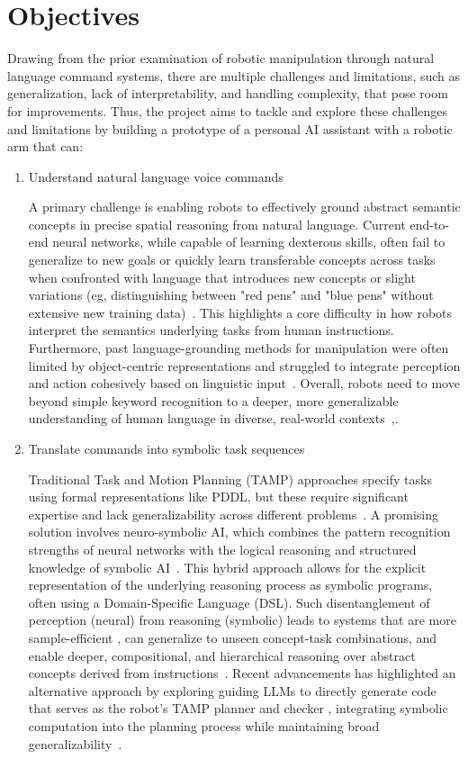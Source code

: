 \documentclass[12pt]{extarticle}
\begin{document}
\section{Objectives}
\label{sec: objectives}
Drawing from the prior examination of robotic manipulation through natural language command systems, there are multiple challenges and limitations, such as generalization, lack of interpretability, and handling complexity, that pose room for improvements. Thus, the project aims to tackle and explore these challenges and limitations by building a prototype of a personal AI assistant with a robotic arm that can:
\begin{enumerate}
  \item Understand natural language voice commands

  A primary challenge is enabling robots to effectively ground abstract semantic concepts in precise spatial reasoning from natural language. Current end-to-end neural networks, while capable of learning dexterous skills, often fail to generalize to new goals or quickly learn transferable concepts across tasks when confronted with language that introduces new concepts or slight variations (eg, distinguishing between "red pens" and "blue pens" without extensive new training data)~\cite{enhancing-interpret}. This highlights a core difficulty in how robots interpret the semantics underlying tasks from human instructions. Furthermore, past language-grounding methods for manipulation were often limited by object-centric representations and struggled to integrate perception and action cohesively based on linguistic input~\cite{cliport}. Overall, robots need to move beyond simple keyword recognition to a deeper, more generalizable understanding of human language in diverse, real-world contexts~\cite{enhancing-interpret},\cite{learning-neuro-symbolic}.

  \item Translate commands into symbolic task sequences

  Traditional Task and Motion Planning (TAMP) approaches specify tasks using formal representations like PDDL, but these require significant expertise and lack generalizability across different problems~\cite{code-as-symbolic-planner}. A promising solution involves neuro-symbolic AI, which combines the pattern recognition strengths of neural networks with the logical reasoning and structured knowledge of symbolic AI~\cite{nsai}. This hybrid approach allows for the explicit representation of the underlying reasoning process as symbolic programs, often using a Domain-Specific Language (DSL). Such disentanglement of perception (neural) from reasoning (symbolic) leads to systems that are more sample-efficient , can generalize to unseen concept-task combinations, and enable deeper, compositional, and hierarchical reasoning over abstract concepts derived from instructions~\cite{enhancing-interpret}. Recent advancements has highlighted an alternative approach by exploring guiding LLMs to directly generate code that serves as the robot's TAMP planner and checker , integrating symbolic computation into the planning process while maintaining broad generalizability~\cite{code-as-symbolic-planner}.


\end{enumerate}
\end{document}
